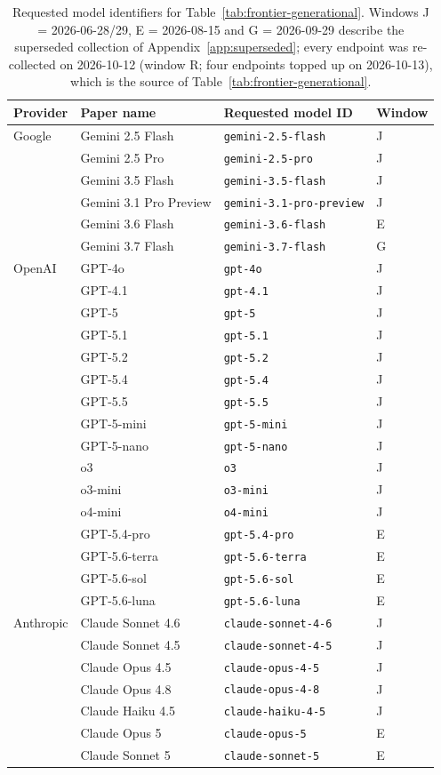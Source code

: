 \documentclass{article}
\begin{document}
\begin{table}[t]
\caption{Requested model identifiers for Table~\ref{tab:frontier-generational}. Windows J = 2026-06-28/29, E = 2026-08-15 and G = 2026-09-29 describe the superseded collection of Appendix~\ref{app:superseded}; every endpoint was re-collected on 2026-10-12 (window R; four endpoints topped up on 2026-10-13), which is the source of Table~\ref{tab:frontier-generational}.}
\label{tab:provenance}
\centering
\small
\begin{tabular}{llll}
\toprule
\textbf{Provider} & \textbf{Paper name} & \textbf{Requested model ID} & \textbf{Window} \\
\midrule
Google & Gemini 2.5 Flash & \texttt{gemini-2.5-flash} & J \\
 & Gemini 2.5 Pro & \texttt{gemini-2.5-pro} & J \\
 & Gemini 3.5 Flash & \texttt{gemini-3.5-flash} & J \\
 & Gemini 3.1 Pro Preview & \texttt{gemini-3.1-pro-preview} & J \\
 & Gemini 3.6 Flash & \texttt{gemini-3.6-flash} & E \\
 & Gemini 3.7 Flash & \texttt{gemini-3.7-flash} & G \\
\midrule
OpenAI & GPT-4o & \texttt{gpt-4o} & J \\
 & GPT-4.1 & \texttt{gpt-4.1} & J \\
 & GPT-5 & \texttt{gpt-5} & J \\
 & GPT-5.1 & \texttt{gpt-5.1} & J \\
 & GPT-5.2 & \texttt{gpt-5.2} & J \\
 & GPT-5.4 & \texttt{gpt-5.4} & J \\
 & GPT-5.5 & \texttt{gpt-5.5} & J \\
 & GPT-5-mini & \texttt{gpt-5-mini} & J \\
 & GPT-5-nano & \texttt{gpt-5-nano} & J \\
 & o3 & \texttt{o3} & J \\
 & o3-mini & \texttt{o3-mini} & J \\
 & o4-mini & \texttt{o4-mini} & J \\
 & GPT-5.4-pro & \texttt{gpt-5.4-pro} & E \\
 & GPT-5.6-terra & \texttt{gpt-5.6-terra} & E \\
 & GPT-5.6-sol & \texttt{gpt-5.6-sol} & E \\
 & GPT-5.6-luna & \texttt{gpt-5.6-luna} & E \\
\midrule
Anthropic & Claude Sonnet 4.6 & \texttt{claude-sonnet-4-6} & J \\
 & Claude Sonnet 4.5 & \texttt{claude-sonnet-4-5} & J \\
 & Claude Opus 4.5 & \texttt{claude-opus-4-5} & J \\
 & Claude Opus 4.8 & \texttt{claude-opus-4-8} & J \\
 & Claude Haiku 4.5 & \texttt{claude-haiku-4-5} & J \\
 & Claude Opus 5 & \texttt{claude-opus-5} & E \\
 & Claude Sonnet 5 & \texttt{claude-sonnet-5} & E \\
\bottomrule
\end{tabular}
\end{table}
\end{document}

